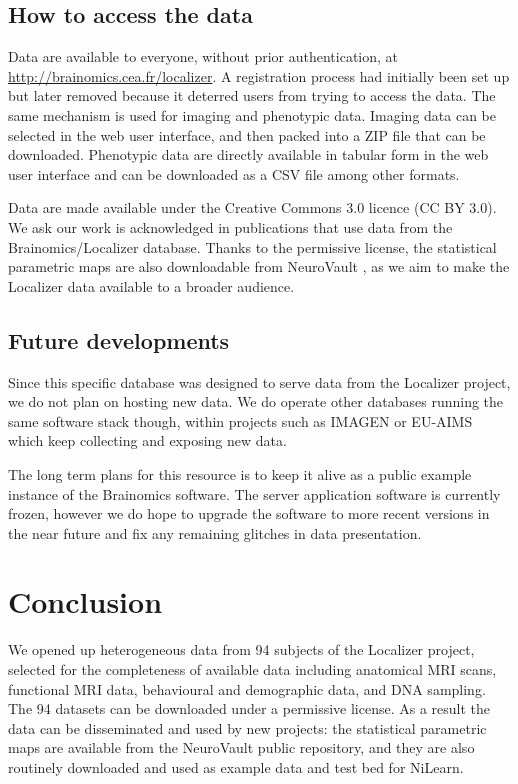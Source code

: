 \documentclass[review]{elsarticle}
\begin{document}
\begin{figure}[ht!]
    \label{fig:summary}
\end{figure}


\subsection{How to access the data}

Data are available to everyone, without prior authentication, at \url{http://brainomics.cea.fr/localizer}. A registration process had initially been set up but later removed because it deterred users from trying to access the data. The same mechanism is used for imaging and phenotypic data. Imaging data can be selected in the web user interface, and then packed into a ZIP file that can be downloaded. Phenotypic data are directly available in tabular form in the web user interface and can be downloaded as a CSV file among other formats.

Data are made available under the Creative Commons 3.0 licence (CC BY 3.0). We ask our work is acknowledged in publications that use data from the Brainomics/Localizer database. Thanks to the permissive license, the statistical parametric maps are also downloadable from NeuroVault \cite{NeuroVault2014}, as we aim to make the Localizer data available to a broader audience.


\subsection{Future developments}

Since this specific database was designed to serve data from the Localizer project, we do not plan on hosting new data. We do operate other databases running the same software stack though, within projects such as IMAGEN \cite{Imagen2010} or EU-AIMS \cite{Aims2014} which keep collecting and exposing new data.

The long term plans for this resource is to keep it alive as a public example instance of the {Brainomics} software. The server application software is currently frozen, however we do hope to upgrade the software to more recent versions in the near future and fix any remaining glitches in data presentation.


\section{Conclusion}

We opened up heterogeneous data from 94 subjects of the Localizer project, selected for the completeness of available data including anatomical MRI scans, functional MRI data, behavioural and demographic data, and DNA sampling. The 94 datasets can be downloaded under a permissive license. As a result the data can be disseminated and used by new projects: the statistical parametric maps are available from the NeuroVault public repository, and they are also routinely downloaded and used as example data and test bed for NiLearn.
\end{document}
